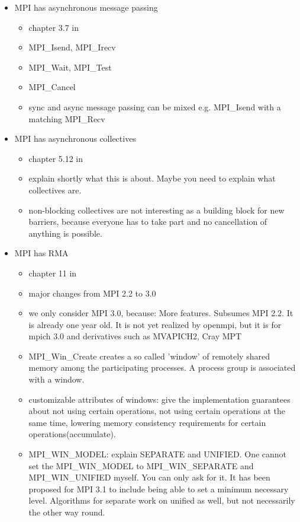 \documentclass[a4paper, 10pt]{article}
\begin{document}
\begin{itemize}
	\item MPI has asynchronous message passing
		\begin{itemize}
			\item chapter 3.7 in \cite{mpi3}
			\item MPI\_Isend, MPI\_Irecv
			\item MPI\_Wait, MPI\_Test
			\item MPI\_Cancel
			\item sync and async message passing can be mixed e.g. MPI\_Isend with a matching MPI\_Recv
		\end{itemize}
	\item MPI has asynchronous collectives
		\begin{itemize}
			\item chapter 5.12 in \cite{mpi3}
			\item explain shortly what this is about. Maybe you need to explain what collectives are.
			\item non-blocking collectives are not interesting as a building block for new barriers, because everyone has to take part and no cancellation of anything is possible.
		\end{itemize}
	\item MPI has RMA
		\begin{itemize}
			\item chapter 11 in \cite{mpi3}
			\item major changes from MPI 2.2\cite{mpi2} to 3.0\cite{mpi3onesided}
			\item we only consider MPI 3.0, because: More features. Subsumes MPI 2.2. It is already one year old. It is not yet realized by openmpi, but it is for mpich 3.0 and derivatives such as MVAPICH2\cite{mvapich}, Cray MPT\cite{craympt}
			\item MPI\_Win\_Create creates a so called 'window' of remotely shared memory among the participating processes. A process group is associated with a window.
			\item customizable attributes of windows: give the implementation guarantees about not using certain operations, not using certain operations at the same time, lowering memory consistency requirements for certain operations(accumulate).
			\item MPI\_WIN\_MODEL: explain SEPARATE and UNIFIED. One cannot set the MPI\_WIN\_MODEL to MPI\_WIN\_SEPARATE and MPI\_WIN\_UNIFIED myself. You can only ask for it. It has been proposed for MPI 3.1 to include being able to set a minimum necessary level. Algorithms for separate work on unified as well, but not necessarily the other way round.

\end{itemize}
\end{itemize}
\end{document}
